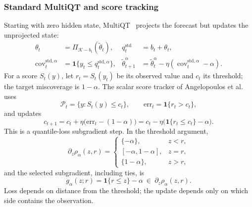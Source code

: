 \documentclass[11pt,a4paper]{article}
\newcommand{\K}{\mathcal{K}}
\newcommand{\ind}{\mathbf{1}}
\newcommand{\std}{\mathrm{std}}
\DeclareMathOperator{\cov}{cov}
\theoremstyle{definition}
\theoremstyle{remark}
\begin{document}
\subsubsection{Standard MultiQT and score tracking}
Starting with zero hidden state, MultiQT~\cite{multiqt} projects the
forecast but updates the unprojected state:
\begin{align}
 \theta_t&=\Pi_{\K-b_t}(\tilde\theta_t),
 &q_t^\std&=b_t+\theta_t,\label{eq:standard-projection}\\
 \cov_t^{\std,\alpha}&=\ind\{y_t\le q_t^{\std,\alpha}\},
 &\tilde\theta_{t+1}^\alpha
 &=\tilde\theta_t^\alpha-\eta(\cov_t^{\std,\alpha}-\alpha).
 \label{eq:standard-update}
\end{align}
For a score $S_t(y)$, let $r_t=S_t(y_t)$ be its observed value and
$c_t$ its threshold; the target miscoverage is $1-\alpha$.
The scalar score tracker of Angelopoulos et al.~\cite{pid} uses
\begin{equation}
 \mathcal P_t=\{y:S_t(y)\le c_t\},\qquad
 \mathrm{err}_t=\ind\{r_t>c_t\},
 \label{eq:score-set}
\end{equation}
and updates
\begin{equation}
 c_{t+1}=c_t+\eta\bigl(\mathrm{err}_t-(1-\alpha)\bigr)
 =c_t-\eta\bigl(\ind\{r_t\le c_t\}-\alpha\bigr).
 \label{eq:pid-update}
\end{equation}
This is a quantile-loss subgradient step. In the threshold argument,
\begin{equation}
 \partial_z\rho_\alpha(z,r)=
 \begin{cases}
 \{-\alpha\},&z<r,\\
 [-\alpha,1-\alpha],&z=r,\\
 \{1-\alpha\},&z>r,
 \end{cases}
 \label{eq:subgradient}
\end{equation}
and the selected subgradient, including ties, is
\begin{equation}
 g_\alpha(z;r)=\ind\{r\le z\}-\alpha
 \ \in\ \partial_z\rho_\alpha(z,r).
 \label{eq:score-gradient}
\end{equation}
Loss depends on distance from the threshold; the update depends only
on which side contains the observation.
\end{document}
